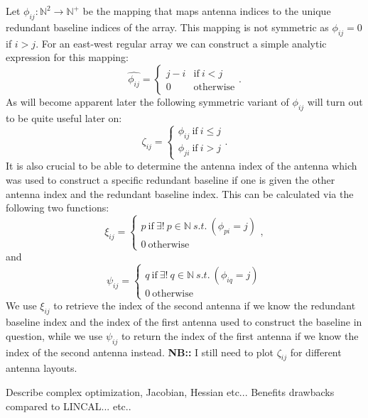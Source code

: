\documentclass[a4paper,fleqn,usenatbib]{mnras}
\begin{document}
Let $\phi_{ij}:\mathbb{N}^2\rightarrow\mathbb{N}^+$ be the mapping that maps antenna indices to the unique redundant baseline indices of the array. This mapping is not symmetric as 
$\phi_{ij} = 0$ if $i>j$. For an east-west regular array we can construct a simple analytic expression for this mapping:
\begin{equation}
\widehat{\phi_{ij}} = 
\begin{cases}
j-i&\textrm{if}~i<j\\
0&\textrm{otherwise}
\end{cases}.
\end{equation}
As will become apparent later the following symmetric variant of $\phi_{ij}$ will turn out to be quite useful later on:
\begin{equation}
\zeta_{ij} = 
\begin{cases}
\phi_{ij}~\textrm{if}~i\leq j\\
\phi_{ji}~\textrm{if}~i>j
\end{cases}.
\end{equation} 
It is also crucial to be able to determine the antenna index of the antenna which was used to construct a specific redundant baseline if one is given the other antenna index and the redundant baseline index. This can be calculated via the following two functions:
\begin{equation}
\xi_{ij} = 
\begin{cases}
p~\textrm{if}~\exists! ~ p \in \mathbb{N} ~ s.t. ~(\phi_{pi} = j)\\
0~\textrm{otherwise}
\end{cases},
\end{equation}
and
\begin{equation}
\psi_{ij} = 
\begin{cases}
q~\textrm{if}~\exists! ~ q \in \mathbb{N} ~ s.t. ~(\phi_{iq} = j)\\
0~\textrm{otherwise}
\end{cases}
\end{equation}
We use $\xi_{ij}$ to retrieve the index of the second antenna if we know the redundant baseline index and the index of the first antenna used to construct the baseline in question, while we use $\psi_{ij}$ to return the index of the first antenna if we know the 
index of the second antenna instead. \textbf{NB::} I still need to plot $\zeta_{ij}$ for different antenna layouts.

Describe complex optimization, Jacobian, Hessian etc... Benefits drawbacks compared to LINCAL... etc..
\end{document}
